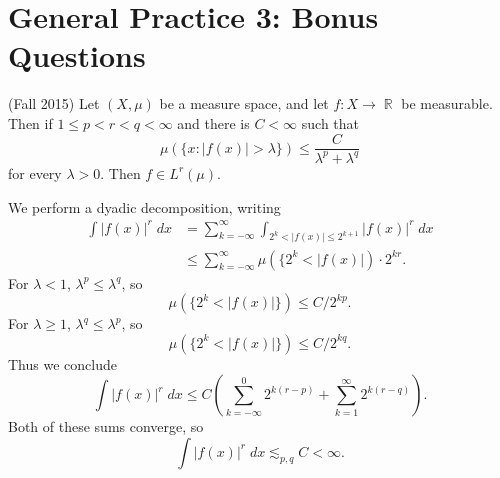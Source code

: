 \documentclass[answers]{exam}
\DeclareMathOperator{\RR}{\mathbb{R}}
\begin{document}
\begin{questions}
\begin{parts}
\begin{solution}
\begin{comment}
    
    Any element of $H^1(\RR_+)$ is continuous, and has a well defined value at zero (a trace). Given $f \in H^1(\RR_+)$, define
    \[ T^*f(x) = \begin{cases} f(0) e^x &: x < 0 \\ f(x) &: x > 0. \end{cases} \]
    Then $T^* f$ is obviously square integrable, and
    \begin{align*}
        \int T^*f(x) \phi(x)\; dx &= f(0) \int_{-\infty}^0 e^x \phi'(x)\; dx + \int_0^\infty f(x) \phi'(x)\; dx\\
        &= f(0) \left[ \phi'(0) - \int_{-\infty}^0 e^x \phi(x)\; dx \right] + \int_0^\infty f(x) \phi'(x)\; dx\\
        &= - f(0) \int_{-\infty}^0 e^x \phi(x)\; dx + \int_0^\infty f(x) \phi'(x)\; dx
    \end{align*}
    
    
    One can argue (Morrey's inequality for example, plus the density of $C_c^\infty(\RR)$ in $H^1(\RR)$), that if $g \in K$, then $g(0) = 0$.
\end{comment}
\end{solution}

\end{parts}







\newpage
\section{General Practice 3: Bonus Questions}

\question (Fall 2015) Let $(X, \mu)$ be a measure space, and let $f: X \to \RR$ be measurable. Then if $1 \leq p < r < q < \infty$ and there is $C < \infty$ such that
%
\[ \mu(\{ x : |f(x)| > \lambda \}) \leq \frac{C}{\lambda^p + \lambda^q} \]
%
for every $\lambda > 0$. Then $f \in L^r(\mu)$.
\begin{solution}
    We perform a dyadic decomposition, writing
    \begin{align*}
        \int |f(x)|^r\; dx &= \sum_{k = -\infty}^\infty \int_{2^k < |f(x)| \leq 2^{k+1}} |f(x)|^r\; dx\\
        &\leq \sum_{k = -\infty}^\infty \mu(\{ 2^k < |f(x)|) \cdot 2^{kr}.
    \end{align*}
    For $\lambda < 1$, $\lambda^p \leq \lambda^q$, so
    \[ \mu(\{ 2^k < |f(x)| \}) \leq C/2^{kp}. \]
    For $\lambda \geq 1$, $\lambda^q \leq \lambda^p$, so
    \[ \mu(\{ 2^k < |f(x)| \}) \leq C/2^{kq}. \]
    Thus we conclude
    \[ \int |f(x)|^r\; dx \leq C \left( \sum_{k = -\infty}^0 2^{k(r - p)} + \sum_{k = 1}^\infty 2^{k(r - q)} \right). \]
    Both of these sums converge, so
    \[  \int |f(x)|^r\; dx \lesssim_{p,q} C < \infty. \]
\end{solution}


\end{questions}
\end{document}
